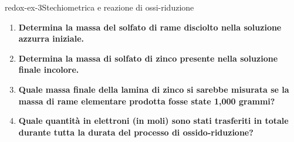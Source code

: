 \documentclass[preview]{standalone}
\begin{document}
\begin{snippetexercise}{redox-ex-3}{Stechiometrica e reazione di ossi-riduzione}
\begin{enumerate}
        \item \textbf{Determina la massa del solfato di rame disciolto nella
        soluzione azzurra iniziale.}

        \item \textbf{Determina la massa di solfato di zinco presente nella soluzione finale incolore.}

        \item \textbf{Quale massa finale della lamina di zinco si sarebbe misurata se la massa di rame
        elementare prodotta fosse state 1,000 grammi?}

        \item \textbf{Quale quantità in elettroni (in moli) sono stati trasferiti in totale
        durante tutta la durata del processo di ossido-riduzione?}
    \end{enumerate}
\end{snippetexercise}
\end{document}
